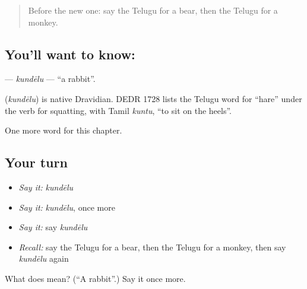 \label{lesson:TE-C123-kundelu}



\begin{quote}
Before the new one: say the Telugu for a bear, then the Telugu for a monkey.
\end{quote}

\subsection*{You'll want to know: }
\textbf{} — \emph{kundēlu} — \textquotedblleft{}a rabbit\textquotedblright{}.

\begin{cousinweb}
\textbf{} (\emph{kundēlu}) is native Dravidian. DEDR 1728 lists the Telugu word for \textquotedblleft{}hare\textquotedblright{} under the verb for squatting, with Tamil \emph{kuntu}, \textquotedblleft{}to sit on the heels\textquotedblright{}.
\end{cousinweb}

\begin{grammarlens}[title={What you've built}]
One more word for this chapter.
\end{grammarlens}

\subsection*{Your turn}
\begin{itemize}
\raggedright
  \item \emph{Say it:} \emph{kundēlu}
  \item \emph{Say it:} \emph{kundēlu}, once more
  \item \emph{Say it:} say \emph{kundēlu}
  \item \emph{Recall:} say the Telugu for a bear, then the Telugu for a monkey, then say \emph{kundēlu} again
\end{itemize}

\begin{tcolorbox}[breakable,colback=teal!4,colframe=teal!35!black,title={Before you move on}]
What does  mean? (\textquotedblleft{}A rabbit\textquotedblright{}.) Say it once more.
\end{tcolorbox}

